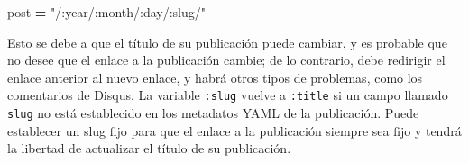 \documentclass[12pt,]{krantz}
\makeatletter
\newenvironment{Shaded}{\begin{snugshade}}{\end{snugshade}}
\newcommand{\NormalTok}[1]{#1}
\newcommand{\OperatorTok}[1]{\textcolor[rgb]{0.81,0.36,0.00}{\textbf{#1}}}
\newcommand{\StringTok}[1]{\textcolor[rgb]{0.31,0.60,0.02}{#1}}
\newenvironment{kframe}{%
\medskip{}
\setlength{\fboxsep}{.8em}
 \def\at@end@of@kframe{}%
 \ifinner\ifhmode%
  \def\at@end@of@kframe{\end{minipage}}%
  \begin{minipage}{\columnwidth}%
 \fi\fi%
 \def\FrameCommand##1{\hskip\@totalleftmargin \hskip-\fboxsep
 \colorbox{shadecolor}{##1}\hskip-\fboxsep
     \hskip-\linewidth \hskip-\@totalleftmargin \hskip\columnwidth}%
 \MakeFramed {\advance\hsize-\width
   \@totalleftmargin\z@ \linewidth\hsize
   \@setminipage}}%
 {\par\unskip\endMakeFramed%
 \at@end@of@kframe}
\renewenvironment{Shaded}{\begin{kframe}}{\end{kframe}}
\theoremstyle{definition}
\theoremstyle{definition}
\theoremstyle{definition}
\theoremstyle{remark}
\makeatother
\begin{document}
\begin{itemize}
\begin{Shaded}
\begin{Highlighting}[]
\NormalTok{[permalinks]}
\NormalTok{    post }\OperatorTok{=} \StringTok{"/:year/:month/:day/:slug/"}
\end{Highlighting}
\end{Shaded}

  Esto se debe a que el título de su publicación puede cambiar, y es
  probable que no desee que el enlace a la publicación cambie; de lo
  contrario, debe redirigir el enlace anterior al nuevo enlace, y habrá
  otros tipos de problemas, como los comentarios de Disqus. La variable
  \texttt{:slug} vuelve a \texttt{:title} si un campo llamado
  \texttt{slug} no está establecido en los metadatos YAML de la
  publicación. Puede establecer un slug fijo para que el enlace a la
  publicación siempre sea fijo y tendrá la libertad de actualizar el
  título de su publicación.


\end{itemize}
\end{document}
